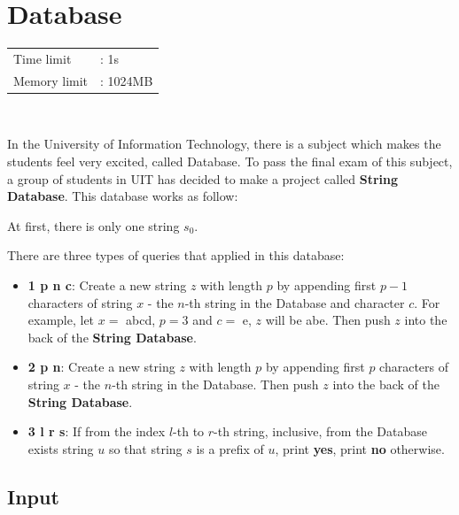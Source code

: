 \documentclass[12pt]{article}
\begin{document}
	\section{Database}
	
	\vspace{-0.5cm}
	\begin{table}[!h]
		\hspace{1cm}
		\begin{tabular}{ll}
			Time limit   &: 1s        \\
			Memory limit &: 1024MB       \\
		\end{tabular}\\
	\end{table}
		
	In the University of Information Technology, there is a subject which makes the students feel very excited, called Database. To pass the final exam of this subject, a group of students in UIT has decided to make a project called \textbf{String Database}. This database works as follow:
	
	At first, there is only one string $s_0$.
	
	There are three types of queries that applied in this database:
	
	\begin{itemize}
		\item {\selectfont \textbf{1 p n c}}: Create a new string $z$ with length $p$ by appending first $p-1$ characters of string $x$ - the $n$-th string in the Database and character $c$. For example, let $x =$ {\selectfont abcd}, $p = 3$ and $c =$ {\selectfont e}, $z$ will be {\selectfont abe}. Then push $z$ into the back of the \textbf{String Database}.
		\item {\selectfont \textbf{2 p n}}: Create a new string $z$ with length $p$ by appending first $p$ characters of string $x$ - the $n$-th string in the Database.  Then push $z$ into the back of the \textbf {String Database}.
		\item {\selectfont \textbf{3 l r s}}: If from the index $l$-th to $r$-th string, inclusive, from the Database exists string $u$ so that string $s$ is a prefix of $u$, print \textbf{{\selectfont yes}}, print \textbf{{\selectfont no}} otherwise.
	\end{itemize}
	
	
	
	\subsection*{Input}
	
\end{document}
